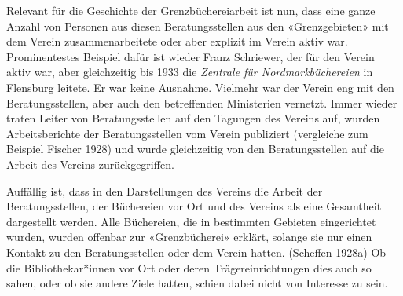 \documentclass[a4paper,
fontsize=11pt,
oneside,
numbers=noperiodatend,
parskip=half-,
bibliography=totoc,
final
]{scrartcl}
\begin{document}
Relevant für die Geschichte der Grenzbüchereiarbeit ist nun, dass eine
ganze Anzahl von Personen aus diesen Beratungsstellen aus den
«Grenzgebieten» mit dem Verein zusammenarbeitete oder aber explizit im
Verein aktiv war. Prominentestes Beispiel dafür ist wieder Franz
Schriewer, der für den Verein aktiv war, aber gleichzeitig bis 1933 die
\emph{Zentrale für Nordmarkbüchereien} in Flensburg leitete. Er war
keine Ausnahme. Vielmehr war der Verein eng mit den Beratungsstellen,
aber auch den betreffenden Ministerien vernetzt. Immer wieder traten
Leiter von Beratungsstellen auf den Tagungen des Vereins auf, wurden
Arbeitsberichte der Beratungsstellen vom Verein publiziert (vergleiche
zum Beispiel Fischer 1928) und wurde gleichzeitig von den
Beratungsstellen auf die Arbeit des Vereins zurückgegriffen.

Auffällig ist, dass in den Darstellungen des Vereins die Arbeit der
Beratungsstellen, der Büchereien vor Ort und des Vereins als eine
Gesamtheit dargestellt werden. Alle Büchereien, die in bestimmten
Gebieten eingerichtet wurden, wurden offenbar zur «Grenzbücherei»
erklärt, solange sie nur einen Kontakt zu den Beratungsstellen oder dem
Verein hatten. (Scheffen 1928a) Ob die Bibliothekar*innen vor Ort oder
deren Trägereinrichtungen dies auch so sahen, oder ob sie andere Ziele
hatten, schien dabei nicht von Interesse zu sein.
\end{document}
